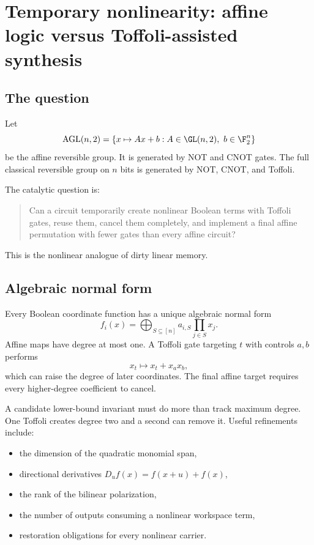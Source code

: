 \chapter{Temporary nonlinearity: affine logic versus Toffoli-assisted synthesis}\label{ch:affine-toffoli}


\section{The question}
Let
\[
\operatorname{AGL}(n,2)
=
\{x\mapsto Ax+b:A\in\GL(n,2),\ b\in\F_2^n\}
\]
be the affine reversible group.  It is generated by NOT and CNOT gates.  The full classical reversible group on $n$ bits is generated by NOT, CNOT, and Toffoli.

The catalytic question is:
\begin{quote}
Can a circuit temporarily create nonlinear Boolean terms with Toffoli gates, reuse them, cancel them completely, and implement a final affine permutation with fewer gates than every affine circuit?
\end{quote}
This is the nonlinear analogue of dirty linear memory.

\section{Algebraic normal form}
Every Boolean coordinate function has a unique algebraic normal form
\[
f_i(x)
=
\bigoplus_{S\subseteq[n]}a_{i,S}\prod_{j\in S}x_j.
\]
Affine maps have degree at most one.  A Toffoli gate targeting $t$ with controls $a,b$ performs
\[
x_t\longmapsto x_t+x_ax_b,
\]
which can raise the degree of later coordinates.  The final affine target requires every higher-degree coefficient to cancel.

A candidate lower-bound invariant must do more than track maximum degree.  One Toffoli creates degree two and a second can remove it.  Useful refinements include:
\begin{itemize}
\item the dimension of the quadratic monomial span,
\item directional derivatives $D_u f(x)=f(x+u)+f(x)$,
\item the rank of the bilinear polarization,
\item the number of outputs consuming a nonlinear workspace term,
\item restoration obligations for every nonlinear carrier.
\end{itemize}

